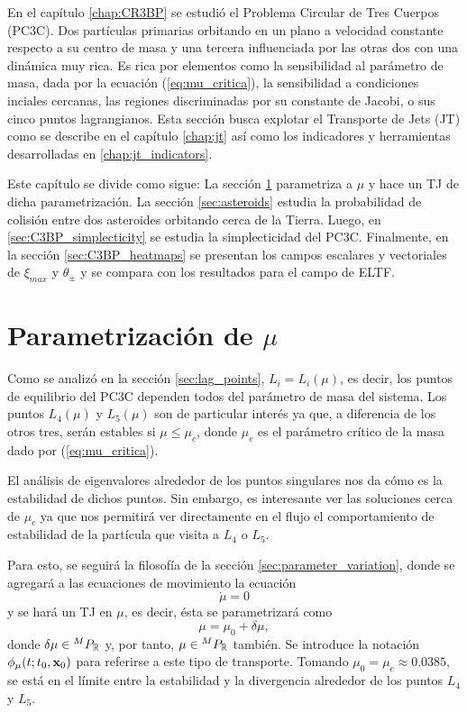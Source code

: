 En el capítulo \ref{chap:CR3BP} se estudió el Problema Circular de Tres Cuerpos (PC3C). Dos partículas primarias orbitando en un plano a velocidad constante respecto a su centro de masa y una tercera influenciada por las otras dos con una dinámica muy rica. Es rica por elementos como la sensibilidad al parámetro de masa, dada por la ecuación (\ref{eq:mu_critica}), la sensibilidad a condiciones inciales cercanas, las regiones discriminadas por su constante de Jacobi, o sus cinco puntos lagrangianos. Esta sección busca explotar el Transporte de Jets (JT) como se describe en el capítulo \ref{chap:jt} así como los indicadores y herramientas desarrolladas en \ref{chap:jt_indicators}.


Este capítulo se divide como sigue: La sección \ref{sec:parametrization} parametriza a $\mu$ y hace un TJ de dicha parametrización. La sección \ref{sec:asteroids} estudia la probabilidad de colisión entre dos asteroides orbitando cerca de la Tierra. Luego, en \ref{sec:C3BP_simplecticity} se estudia la simplecticidad del PC3C. Finalmente, en la sección \ref{sec:C3BP_heatmaps} se presentan los campos escalares y vectoriales de $\xi_{max}$ y $\theta_{\pm}$ y se compara con los resultados para el campo de ELTF.

\section{Parametrización de $\mu$}
\label{sec:parametrization}

Como se analizó en la sección \ref{sec:lag_points}, $L_i = L_i(\mu)$, es decir, los puntos de equilibrio del PC3C dependen todos del parámetro de masa del sistema. Los puntos $L_4(\mu)$ y $L_5(\mu)$ son de particular interés ya que, a diferencia de los otros tres, serán estables si $\mu \leq \mu_c$, donde $\mu_c$ es el parámetro crítico de la masa dado por (\ref{eq:mu_critica}). 

El análisis de eigenvalores alrededor de los puntos singulares nos da cómo es la estabilidad de dichos puntos. Sin embargo, es interesante ver las soluciones cerca de $\mu_c$ ya que nos permitirá ver directamente en el flujo el comportamiento de estabilidad de la partícula que visita a $L_4$ o $L_5$.

Para esto, se seguirá la filosofía de la sección \ref{sec:parameter_variation}, donde se agregará a las ecuaciones de movimiento la ecuación 
\begin{equation*}
 \dot{\mu} = 0
\end{equation*}
y se hará un TJ en $\mu$, es decir, ésta se parametrizará como 
\begin{equation*}
 \mu = \mu_0 + \delta\mu,
\end{equation*}   
donde $\delta\mu \in {^{M}P_{\mathbb{R}}}$ y, por tanto, $\mu \in {^{M}P_{\mathbb{R}}}$ también. Se introduce la notación $\phi_\mu(t;t_0,\mathbf{x}_0)$ para referirse a este tipo de transporte. Tomando $\mu_0 = \mu_c \approx 0.0385$, se está en el límite entre la estabilidad y la divergencia alrededor de los puntos $L_4$ y $L_5$.

